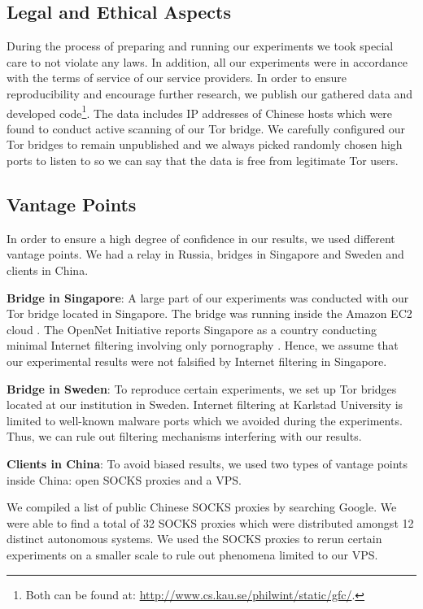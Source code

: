 \documentclass[runningheads,a4paper]{llncs}
\begin{document}
\subsection{Legal and Ethical Aspects}
During the process of preparing and running our experiments we took special care to not violate any
laws. In addition, all our experiments were in accordance with the terms of service of our service
providers. In order to ensure reproducibility and encourage further research, we publish our
gathered data and developed code\footnote{Both can be found at:
\url{http://www.cs.kau.se/philwint/static/gfc/}.}. The data includes IP addresses of Chinese hosts
which were found to conduct active scanning of our Tor bridge. We carefully configured our Tor
bridges to remain unpublished and we always picked randomly chosen high ports to listen to so we can
say that the data is free from legitimate Tor users.

\subsection{Vantage Points}
In order to ensure a high degree of confidence in our results, we used different vantage points. We
had a relay in Russia, bridges in Singapore and Sweden and clients in China.

\textbf{Bridge in Singapore}: A large part of our experiments was conducted with our Tor bridge
located in Singapore. The bridge was running inside the Amazon EC2 cloud \cite{ec2}. The OpenNet
Initiative reports Singapore as a country conducting minimal Internet filtering involving only
pornography \cite{opennet}. Hence, we assume that our experimental results were not falsified by
Internet filtering in Singapore.

\textbf{Bridge in Sweden}: To reproduce certain experiments, we set up Tor bridges located at our
institution in Sweden. Internet filtering at Karlstad University is limited to well-known malware
ports which we avoided during the experiments. Thus, we can rule out filtering mechanisms
interfering with our results.

\textbf{Clients in China}: To avoid biased results, we used two types of vantage points inside
China: open SOCKS proxies and a VPS.

We compiled a list of public Chinese SOCKS proxies by searching Google. We were able to find a total
of 32 SOCKS proxies which were distributed amongst 12 distinct autonomous systems. We used the
SOCKS proxies to rerun certain experiments on a smaller scale to rule out phenomena limited to our
VPS.
\end{document}
